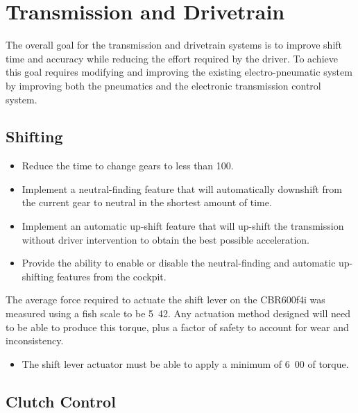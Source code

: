 \section{Transmission and Drivetrain}

The overall goal for the transmission and drivetrain systems is to improve shift time and accuracy while reducing the effort required by the driver. To achieve this goal requires modifying and improving the existing electro-pneumatic system by improving both the pneumatics and the electronic transmission control system. 

\subsection{Shifting}

\begin{itemize}
\item Reduce the time to change gears to less than \unit{100}{\milli\second}. 
\item Implement a neutral-finding feature that will automatically downshift from the current gear to neutral in the shortest amount of time.
\item Implement an automatic up-shift feature that will up-shift the transmission without driver intervention to obtain the best possible acceleration.
\item Provide the ability to enable or disable the neutral-finding and automatic up-shifting features from the cockpit.
\end{itemize}

The average force required to actuate the shift lever on the CBR600f4i was measured using a fish scale to be \unit{5.42}{\newton\metre}. Any actuation method designed will need to be able to produce this torque, plus a factor of safety to account for wear and inconsistency.

\begin{itemize}
\item The shift lever actuator must be able to apply a minimum of \unit{6.00}{\newton\metre} of torque.
\end{itemize}

\subsection{Clutch Control}

